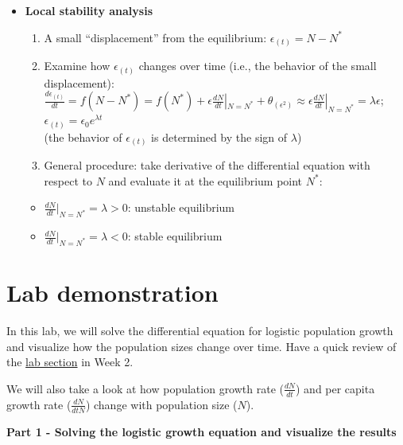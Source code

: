 \documentclass[
]{book}
\providecommand{\tightlist}{%
  \setlength{\itemsep}{0pt}\setlength{\parskip}{0pt}}
\begin{document}
\begin{itemize}
\tightlist
\item
  \textbf{Local stability analysis}

  \begin{enumerate}
  \def\labelenumi{\arabic{enumi}.}
  \tightlist
  \item
    A small ``displacement'' from the equilibrium: \(\epsilon_{(t)} = N - N^*\)
  \item
    Examine how \(\epsilon_{(t)}\) changes over time (i.e., the behavior of the small displacement): \(\frac{d\epsilon_{(t)}}{dt} = f(N-N^*) = f(N^*) + \epsilon \frac{dN}{dt}|_{N = N^*} + \theta_{(\epsilon^2)} \approx \epsilon\frac{dN}{dt}|_{N = N^*} = \lambda \epsilon\); \(\epsilon_{(t)} = \epsilon_{0}e^{\lambda t}\)\\
    (the behavior of \(\epsilon_{(t)}\) is determined by the sign of \(\lambda\))
  \item
    General procedure: take derivative of the differential equation with respect to \(N\) and evaluate it at the equilibrium point \(N^*\):
  \end{enumerate}

  \begin{itemize}
  \tightlist
  \item
    \(\frac{dN}{dt}|_{N = N^*} = \lambda > 0\): unstable equilibrium
  \item
    \(\frac{dN}{dt}|_{N = N^*} = \lambda < 0\): stable equilibrium
  \end{itemize}
\end{itemize}

\hypertarget{lab-demonstration-2}{%
\section*{Lab demonstration}\label{lab-demonstration-2}}

In this lab, we will solve the differential equation for logistic population growth and visualize how the population sizes change over time. Have a quick review of the \href{https://genchanghsu.github.io/2021_Fall_Introduction_to_Theoretical_Ecology/week-2.html\#lab-demonstration-1}{lab section} in Week 2.

We will also take a look at how population growth rate (\(\frac{dN}{dt}\)) and per capita growth rate (\(\frac{dN}{dtN}\)) change with population size (\(N\)).

\textbf{Part 1 - Solving the logistic growth equation and visualize the results}
\end{document}

